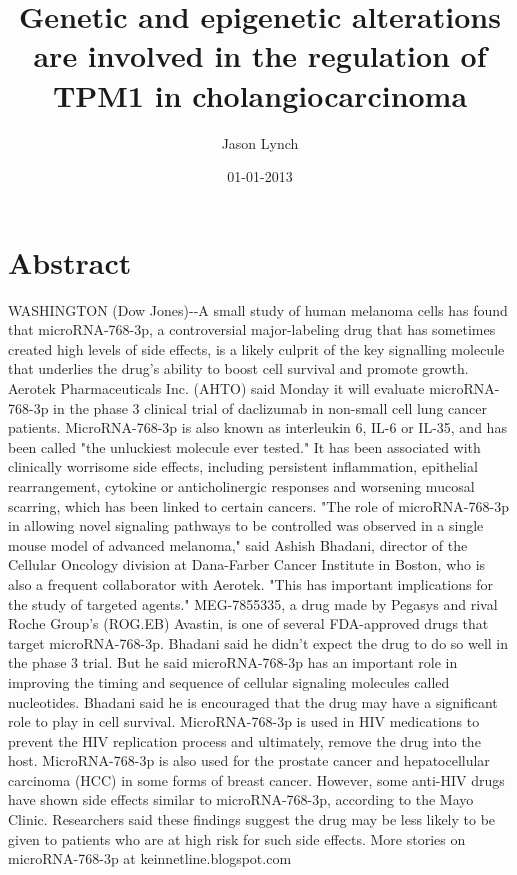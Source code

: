 \documentclass{article}%
\title{Genetic and epigenetic alterations are involved in the regulation of TPM1 in cholangiocarcinoma}%
\author{Jason Lynch}%
\affil{Division of Cardio{-}Vascular Medicine, Department of Internal Medicine, Kurume University School of Medicine, Fukuoka, Japan}%
\date{01{-}01{-}2013}%
\begin{document}
%
\normalsize%
\maketitle%
\section{Abstract}%
\label{sec:Abstract}%
WASHINGTON (Dow Jones){-}{-}A small study of human melanoma cells has found that microRNA{-}768{-}3p, a controversial major{-}labeling drug that has sometimes created high levels of side effects, is a likely culprit of the key signalling molecule that underlies the drug's ability to boost cell survival and promote growth.\newline%
Aerotek Pharmaceuticals Inc. (AHTO) said Monday it will evaluate microRNA{-}768{-}3p in the phase 3 clinical trial of daclizumab in non{-}small cell lung cancer patients.\newline%
MicroRNA{-}768{-}3p is also known as interleukin 6, IL{-}6 or IL{-}35, and has been called "the unluckiest molecule ever tested." It has been associated with clinically worrisome side effects, including persistent inflammation, epithelial rearrangement, cytokine or anticholinergic responses and worsening mucosal scarring, which has been linked to certain cancers.\newline%
"The role of microRNA{-}768{-}3p in allowing novel signaling pathways to be controlled was observed in a single mouse model of advanced melanoma," said Ashish Bhadani, director of the Cellular Oncology division at Dana{-}Farber Cancer Institute in Boston, who is also a frequent collaborator with Aerotek. "This has important implications for the study of targeted agents."\newline%
MEG{-}7855335, a drug made by Pegasys and rival Roche Group's (ROG.EB) Avastin, is one of several FDA{-}approved drugs that target microRNA{-}768{-}3p.\newline%
Bhadani said he didn't expect the drug to do so well in the phase 3 trial. But he said microRNA{-}768{-}3p has an important role in improving the timing and sequence of cellular signaling molecules called nucleotides.\newline%
Bhadani said he is encouraged that the drug may have a significant role to play in cell survival.\newline%
MicroRNA{-}768{-}3p is used in HIV medications to prevent the HIV replication process and ultimately, remove the drug into the host. MicroRNA{-}768{-}3p is also used for the prostate cancer and hepatocellular carcinoma (HCC) in some forms of breast cancer.\newline%
However, some anti{-}HIV drugs have shown side effects similar to microRNA{-}768{-}3p, according to the Mayo Clinic. Researchers said these findings suggest the drug may be less likely to be given to patients who are at high risk for such side effects.\newline%
More stories on microRNA{-}768{-}3p at keinnetline.blogspot.com
\end{document}
